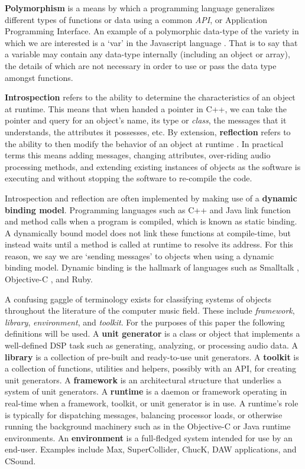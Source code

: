 \documentclass[twoside,10pt]{article}
\begin{document}
\textbf{Polymorphism} is a means by which a programming language generalizes different types of functions or data using a common \emph{API}, or Application Programming Interface.  An example of a polymorphic data-type of the variety in which we are interested is a `var' in the Javascript language \cite{Flanagan:2002}.  That is to say that a variable may contain any data-type internally (including an object or array), the details of which are not necessary in order to use or pass the data type amongst functions.

\textbf{Introspection} refers to the ability to determine the characteristics of an object at runtime.  This means that when handed a pointer in C++, we can take the pointer and query for an object's name, its type or \emph{class}, the messages that it understands, the attributes it possesses, etc.  By extension, \textbf{reflection} refers to the ability to then modify the behavior of an object at runtime \cite{Malenfant:1996}.  In practical terms this means adding messages, changing attributes, over-riding audio processing methods, and extending existing instances of objects as the software is executing and without stopping the software to re-compile the code.

Introspection and reflection are often implemented by making use of a \textbf{dynamic binding model}.  Programming languages such as C++ and Java link function and method calls when a program is compiled, which is known as static binding.  A dynamically bound model does not link these functions at compile-time, but instead waits until a method is called at runtime to resolve its address.  For this reason, we say we are `sending messages' to objects when using a dynamic binding model.  Dynamic binding is the hallmark of languages such as Smalltalk \cite{Krasner:1988}, Objective-C \cite{Cox:1986}, and Ruby.

A confusing gaggle of terminology exists for classifying systems of objects throughout the literature of the computer music field.  These include \emph{framework}, \emph{library}, \emph{environment}, and \emph{toolkit}.  For the purposes of this paper the following definitions will be used.  
A \textbf{unit generator} is a class or object that implements a well-defined DSP task such as generating, analyzing, or processing audio data.
A \textbf{library} is a collection of pre-built and ready-to-use unit generators.
A \textbf{toolkit} is a collection of functions, utilities and helpers, possibly with an API, for creating unit generators.
A \textbf{framework} is an architectural structure that underlies a system of unit generators.
A \textbf{runtime} is a daemon or framework operating in real-time when a framework, toolkit, or unit generator is in use. A runtime's role is typically for dispatching messages, balancing processor loads, or otherwise running the background machinery such as in the Objective-C or Java runtime environments.
An \textbf{environment} is a full-fledged system intended for use by an end-user.  Examples include Max, SuperCollider, ChucK, DAW applications, and CSound.
\end{document}

